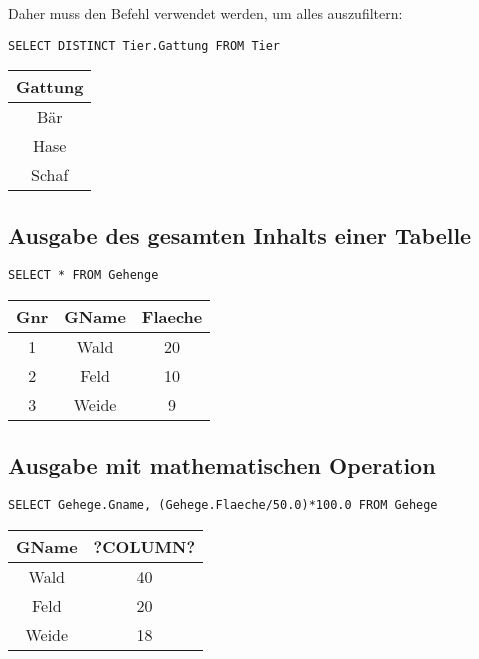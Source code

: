     Daher muss den Befehl  verwendet werden, um alles auszufiltern:
    \begin{lstlisting}[style=sqlstyle]
        SELECT DISTINCT Tier.Gattung FROM Tier
    \end{lstlisting}

    \begin{table}[H]
        \centering
        \begin{tabular}{|c|}
            \hline
            \textbf{Gattung} \\
            \hline
            Bär \\
            Hase \\
            Schaf \\
            \hline
        \end{tabular}
    \end{table}

\subsection{Ausgabe des gesamten Inhalts einer Tabelle}
    \begin{lstlisting}[style=sqlstyle]
        SELECT * FROM Gehenge
    \end{lstlisting}

    \begin{table}[H]
        \centering
        \begin{tabular}{|c|c|c|}
            \hline
            \textbf{Gnr} & \textbf{GName} & \textbf{Flaeche} \\
            \hline
            1 & Wald & 20 \\
            \hline
            2 & Feld & 10 \\
            \hline
            3 & Weide & 9 \\
            \hline
        \end{tabular}
    \end{table}

\subsection{Ausgabe mit mathematischen Operation}
    \begin{lstlisting}[style=sqlstyle]
        SELECT Gehege.Gname, (Gehege.Flaeche/50.0)*100.0 FROM Gehege
    \end{lstlisting}

    \begin{table}[H]
        \centering
        \begin{tabular}{|c|c|}
            \hline
            \textbf{GName} & \textbf{?COLUMN?} \\
            \hline
            Wald & 40 \\
            \hline
            Feld & 20 \\
            \hline
            Weide & 18 \\
            \hline
        \end{tabular}
    \end{table}

